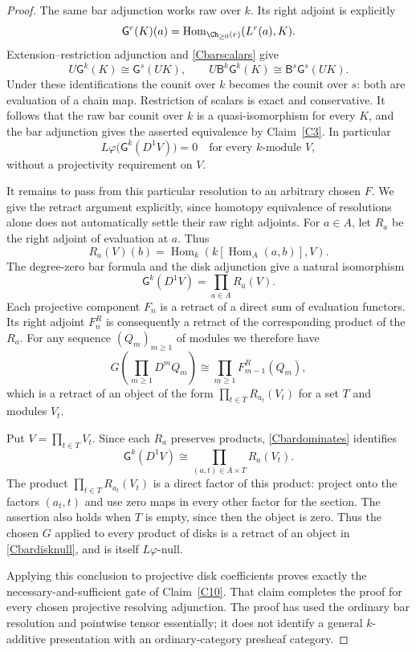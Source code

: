 \begin{proof}
The same bar adjunction works raw over $k$. Its right adjoint is explicitly
\[
 \mathsf G^r(K)(a)=
 \operatorname{Hom}_{\Ch_{\geq0}(r)}(L^r(a),K).
\]
Extension--restriction adjunction and \eqref{Cbarscalars} give
\[
 U\mathsf G^k(K)\cong\mathsf G^s(UK),\qquad
 U\mathsf B^k\mathsf G^k(K)
 \cong\mathsf B^s\mathsf G^s(UK).
\]
Under these identifications the counit over $k$ becomes the counit over $s$: both are evaluation of a chain map. Restriction of scalars is exact and conservative. It follows that the raw bar counit over $k$ is a quasi-isomorphism for every $K$, and the bar adjunction gives the asserted equivalence by Claim~\ref{C3}. In particular
\[
 L\varphi\bigl(\mathsf G^k(D^1 V)\bigr)=0
 \quad\text{for every }k\text{-module }V,
 \tag{C-bar-disk-null}\label{Cbardisknull}
\]
without a projectivity requirement on $V$.

It remains to pass from this particular resolution to an arbitrary chosen $F$. We give the retract argument explicitly, since homotopy equivalence of resolutions alone does not automatically settle their raw right adjoints. For $a\in A$, let $R_a$ be the right adjoint of evaluation at $a$. Thus
\[
 R_a(V)(b)=\operatorname{Hom}_k(k[\operatorname{Hom}_A(a,b)],V).
\]
The degree-zero bar formula and the disk adjunction give a natural isomorphism
\[
 \mathsf G^k(D^1V)=\prod_{a\in A}R_a(V).
 \tag{C-bar-dominates}\label{Cbardominates}
\]
Each projective component $F_n$ is a retract of a direct sum of evaluation functors. Its right adjoint $F_n^R$ is consequently a retract of the corresponding product of the $R_a$. For any sequence $(Q_m)_{m\geq1}$ of modules we therefore have
\[
 G\!\left(\prod_{m\geq1}D^mQ_m\right)
 \cong\prod_{m\geq1}F_{m-1}^R(Q_m),
\]
which is a retract of an object of the form $\prod_{t\in T}R_{a_t}(V_t)$ for a set $T$ and modules $V_t$.

Put $V=\prod_{t\in T}V_t$. Since each $R_a$ preserves products, \eqref{Cbardominates} identifies
\[
 \mathsf G^k(D^1V)
 \cong\prod_{(a,t)\in A\times T}R_a(V_t).
\]
The product $\prod_{t\in T}R_{a_t}(V_t)$ is a direct factor of this product: project onto the factors $(a_t,t)$ and use zero maps in every other factor for the section. The assertion also holds when $T$ is empty, since then the object is zero. Thus the chosen $G$ applied to every product of disks is a retract of an object in \eqref{Cbardisknull}, and is itself $L\varphi$-null.

Applying this conclusion to projective disk coefficients proves exactly the necessary-and-sufficient gate of Claim~\ref{C10}. That claim completes the proof for every chosen projective resolving adjunction. The proof has used the ordinary bar resolution and pointwise tensor essentially; it does not identify a general $k$-additive presentation with an ordinary-category presheaf category.
\end{proof}
